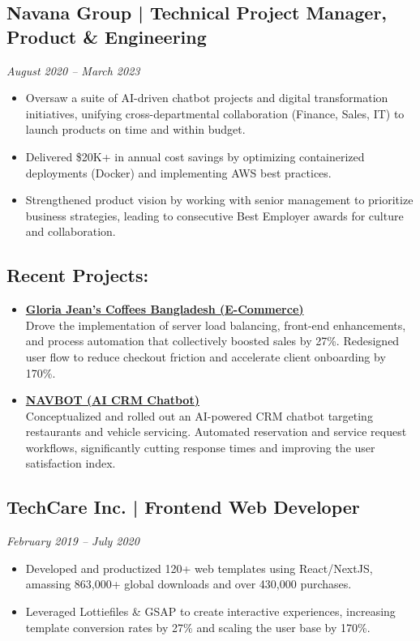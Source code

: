 \documentclass[a4paper,10pt]{article}
\begin{document}
\subsection*{Navana Group | Technical Project Manager, Product \& Engineering}
\textit{August 2020 – March 2023}
\begin{itemize}[leftmargin=*]
    \item Oversaw a suite of AI-driven chatbot projects and digital transformation initiatives, unifying cross-departmental collaboration (Finance, Sales, IT) to launch products on time and within budget.
    \item Delivered \$20K+ in annual cost savings by optimizing containerized deployments (Docker) and implementing AWS best practices.
    \item Strengthened product vision by working with senior management to prioritize business strategies, leading to consecutive Best Employer awards for culture and collaboration.
\end{itemize}

\subsection*{Recent Projects:}
\begin{itemize}[leftmargin=*]
    \item \textbf{\href{https://gloriajeanscoffeesbd.com/menu}{Gloria Jean’s Coffees Bangladesh (E-Commerce)}} \\
    Drove the implementation of server load balancing, front-end enhancements, and process automation that collectively boosted sales by 27\%. Redesigned user flow to reduce checkout friction and accelerate client onboarding by 170\%.

    \item \textbf{\href{https://atiqisrak.vercel.app/}{NAVBOT (AI CRM Chatbot)}} \\
    Conceptualized and rolled out an AI-powered CRM chatbot targeting restaurants and vehicle servicing. Automated reservation and service request workflows, significantly cutting response times and improving the user satisfaction index.
\end{itemize}

\subsection*{TechCare Inc. | Frontend Web Developer}
\textit{February 2019 – July 2020}
\begin{itemize}[leftmargin=*]
    \item Developed and productized 120+ web templates using React/NextJS, amassing 863,000+ global downloads and over 430,000 purchases. 
    \item Leveraged Lottiefiles \& GSAP to create interactive experiences, increasing template conversion rates by 27\% and scaling the user base by 170\%.
\end{itemize}
\end{document}
